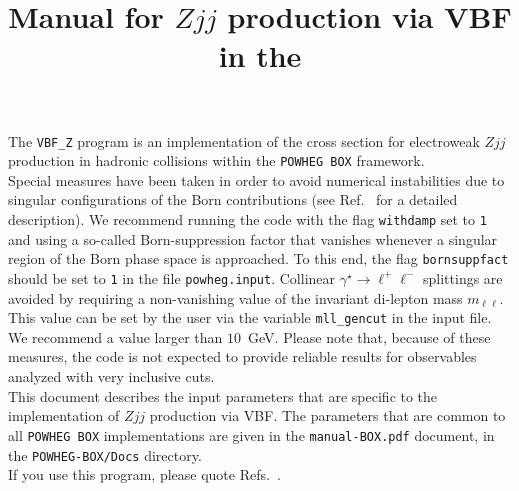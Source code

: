 \documentclass[a4paper,11pt]{article}
\title{Manual for $Zjj$ production via VBF in the \POWHEGBOX{}}
\date{}
\def\pbox{{\tt POWHEG BOX}}
\begin{document}
\maketitle
%
\noindent
The {\tt VBF\_Z} program is an implementation of the cross section for electroweak
$Z jj$ production in hadronic collisions within the \pbox{} framework. 
%
\\[2ex]
%
Special measures have been taken in order to avoid numerical instabilities due to singular configurations of the Born contributions (see Ref.~\cite{JSZ} for a detailed description). We recommend running the code with the flag {\tt withdamp} set to {\tt 1} and using a so-called Born-suppression factor that vanishes whenever a singular region of the Born phase space is approached. To this end, the flag {\tt bornsuppfact} should be set to {\tt 1} in the file {\tt powheg.input}. Collinear $\gamma^\star\to \ell^+\ell^-$ splittings are avoided by requiring a non-vanishing value of the invariant di-lepton mass $m_{\ell\ell}$. This value can be set by the user via the variable {\tt mll\_gencut} in the input file. We recommend a value larger than $10$~GeV. 
%
Please note that, because of these measures, the code is not expected to provide reliable results for observables analyzed with very inclusive cuts. 
%
\\[2ex]
%
This document describes the input parameters that are specific to the
implementation of $Zjj$ production via VBF. 
%
The parameters that are common to all {\tt POWHEG BOX} implementations are given in
the {\tt manual-BOX.pdf} document, in the {\tt POWHEG-BOX/Docs}
directory.
\\[2ex]
If you use this program, please quote
Refs.~\cite{JSZ,Alioli:2010xd}.
\end{document}
